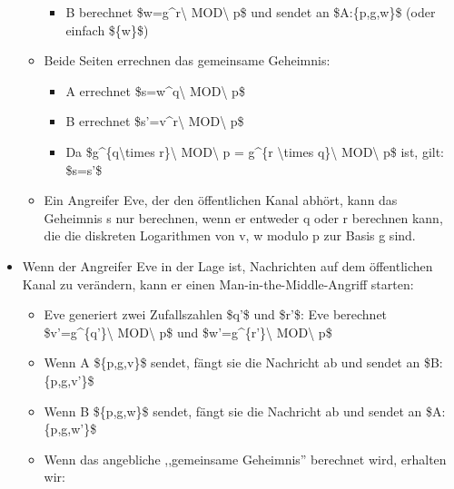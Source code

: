 \documentclass[a4paper]{article}
\begin{document}
\begin{multicols}{3}
\begin{itemize}
\begin{itemize}
                        \begin{itemize}
                            \item
                                  B berechnet \$w=g\^{}r\textbackslash{} MOD\textbackslash{} p\$ und
                                  sendet an \$A:\{p,g,w\}\$ (oder einfach \$\{w\}\$)
                        \end{itemize}
                  \item
                        Beide Seiten errechnen das gemeinsame Geheimnis:

                        \begin{itemize}
                            \item
                                  A errechnet \$s=w\^{}q\textbackslash{} MOD\textbackslash{} p\$
                            \item
                                  B errechnet \$s'=v\^{}r\textbackslash{} MOD\textbackslash{} p\$
                            \item
                                  Da \$g\^{}\{q\textbackslash times r\}\textbackslash{}
                                  MOD\textbackslash{} p = g\^{}\{r \textbackslash times
                                  q\}\textbackslash{} MOD\textbackslash{} p\$ ist, gilt: \$s=s'\$
                        \end{itemize}
                  \item
                        Ein Angreifer Eve, der den öffentlichen Kanal abhört, kann das
                        Geheimnis s nur berechnen, wenn er entweder q oder r berechnen kann,
                        die die diskreten Logarithmen von v, w modulo p zur Basis g sind.
              \end{itemize}
        \item
              Wenn der Angreifer Eve in der Lage ist, Nachrichten auf dem
              öffentlichen Kanal zu verändern, kann er einen
              Man-in-the-Middle-Angriff starten:

              \begin{itemize}
                  \item
                        Eve generiert zwei Zufallszahlen \$q'\$ und \$r'\$: Eve berechnet
                        \$v'=g\^{}\{q'\}\textbackslash{} MOD\textbackslash{} p\$ und
                        \$w'=g\^{}\{r'\}\textbackslash{} MOD\textbackslash{} p\$
                  \item
                        Wenn A \$\{p,g,v\}\$ sendet, fängt sie die Nachricht ab und sendet
                        an \$B:\{p,g,v'\}\$
                  \item
                        Wenn B \$\{p,g,w\}\$ sendet, fängt sie die Nachricht ab und sendet
                        an \$A:\{p,g,w'\}\$
                  \item
                        Wenn das angebliche ,,gemeinsame Geheimnis'' berechnet wird,
                        erhalten wir:


\end{itemize}
\end{itemize}
\end{multicols}
\end{document}
